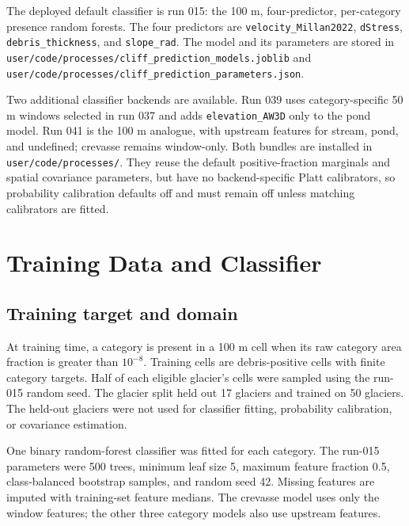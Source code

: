 \documentclass[11pt,a4paper]{article}
\begin{document}
The deployed default classifier is run 015: the 100 m, four-predictor, per-category
presence random forests. The four predictors are \texttt{velocity\_Millan2022},
\texttt{dStress}, \texttt{debris\_thickness}, and \texttt{slope\_rad}. The model
and its parameters are stored in
\texttt{user/code/processes/cliff\_prediction\_models.joblib} and
\texttt{user/code/processes/cliff\_prediction\_parameters.json}.

Two additional classifier backends are available. Run 039 uses category-specific
50 m windows selected in run 037 and adds \texttt{elevation\_AW3D} only to the
pond model. Run 041 is the 100 m analogue, with upstream features for stream,
pond, and undefined; crevasse remains window-only. Both bundles are installed
in \texttt{user/code/processes/}. They reuse the default positive-fraction
marginals and spatial covariance parameters, but have no backend-specific Platt
calibrators, so probability calibration defaults off and must remain off unless
matching calibrators are fitted.

\section{Training Data and Classifier}
\subsection{Training target and domain}
At training time, a category is present in a 100 m cell when its raw category
area fraction is greater than $10^{-8}$. Training cells are debris-positive
cells with finite category targets. Half of each eligible glacier's cells were
sampled using the run-015 random seed. The glacier split held out 17 glaciers
and trained on 50 glaciers. The held-out glaciers were not used for classifier
fitting, probability calibration, or covariance estimation.

One binary random-forest classifier was fitted for each category. The run-015
parameters were 500 trees, minimum leaf size 5, maximum feature fraction 0.5,
class-balanced bootstrap samples, and random seed 42. Missing features are
imputed with training-set feature medians. The crevasse model uses only the
window features; the other three category models also use upstream features.
\end{document}

